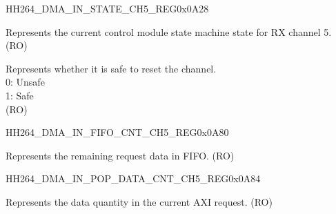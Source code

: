 \begin{register}{H}{H264\_DMA\_IN\_STATE\_CH5\_REG}{0x0A28}\label{regdesc:H264DMAINSTATECH5REG}
%
%
%
\regnewline%
\begin{regdesc}\begin{reglist}
\label{fielddesc:H264DMAINSTATECH5}\item [H264\_DMA\_IN\_STATE\_CH5] Represents the current control module state machine state for RX channel 5. (RO)
\label{fielddesc:H264DMAINRESETAVAILCH5}\item [H264\_DMA\_IN\_RESET\_AVAIL\_CH5] Represents whether it is safe to reset the channel.
\\0: Unsafe
\\1: Safe\\ (RO)
\end{reglist}\end{regdesc}
\end{register}

\begin{register}{H}{H264\_DMA\_IN\_FIFO\_CNT\_CH5\_REG}{0x0A80}\label{regdesc:H264DMAINFIFOCNTCH5REG}
%
%
\regnewline%
\begin{regdesc}\begin{reglist}
\label{fielddesc:H264DMAINCMDFIFOINFIFOCNTCH5}\item [H264\_DMA\_IN\_CMDFIFO\_INFIFO\_CNT\_CH5] Represents the remaining request data in FIFO. (RO)
\end{reglist}\end{regdesc}
\end{register}


\begin{register}{H}{H264\_DMA\_IN\_POP\_DATA\_CNT\_CH5\_REG}{0x0A84}\label{regdesc:H264DMAINPOPDATACNTCH5REG}
%
%
\regnewline%
\begin{regdesc}\begin{reglist}
\label{fielddesc:H264DMAINCMDFIFOPOPDATACNTCH5}\item [H264\_DMA\_IN\_CMDFIFO\_POP\_DATA\_CNT\_CH5] Represents the data quantity in the current AXI request. (RO)
\end{reglist}\end{regdesc}
\end{register}


